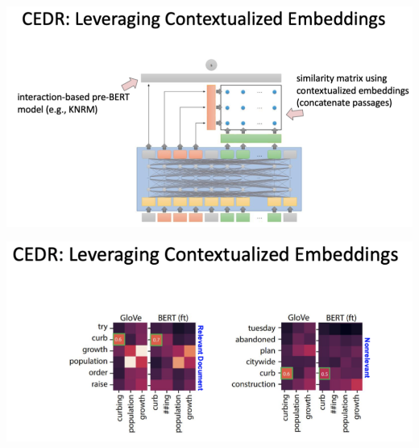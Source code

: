 \vspace{1cm}

\begin{minipage}{0.5\textwidth}
\includegraphics[scale=0.5]{figures/bert7.png}
\end{minipage}
\begin{minipage}{0.5\textwidth}
\includegraphics[scale=0.5]{figures/bert8.png}
\end{minipage}

\vspace{0.75cm}

